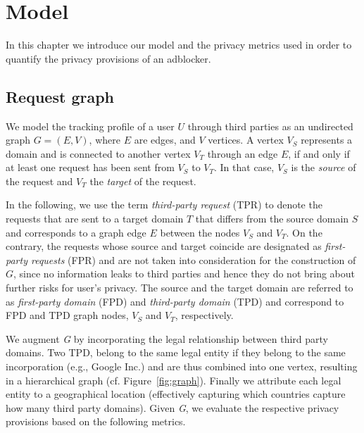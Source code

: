 \chapter{Model}
\label{sec:privacy_metrics}
In this chapter we introduce our model and the privacy metrics used in order to quantify the privacy provisions of an adblocker.

\section{Request graph}
\label{sec:graph_definition}
We model the tracking profile of a user $U$ through third parties as an undirected graph $G=(E,V)$, where $E$ are edges, and $V$ vertices. A vertex $V_S$ represents a domain and is connected to another vertex $V_T$ through an edge $E$, if and only if at least one request has been sent from $V_S$ to $V_T$. In that case, $V_S$ is the \textit{source} of the request and $V_T$ the \textit{target} of the request.

In the following, we use the term \textit{third-party request} (TPR) to denote the requests that are sent to a target domain $T$ that differs from the source domain $S$ and corresponds to a graph edge $E$ between the nodes $V_S$ and $V_T$. On the contrary, the requests whose source and target coincide are designated as \textit{first-party requests} (FPR) and are not taken into consideration for the construction of $G$, since no information leaks to third parties and hence they do not bring about further risks for user's privacy. The source and the target domain are referred to as \textit{first-party domain} (FPD) and \textit{third-party domain} (TPD) and correspond to FPD and TPD graph nodes, $V_S$ and $V_T$, respectively.

We augment \emph{G} by incorporating the legal relationship between third party domains. Two TPD, belong to the same legal entity if they belong to the same incorporation (e.g., Google Inc.) and are thus combined into one vertex, resulting in a hierarchical graph (cf. Figure~\ref{fig:graph}). Finally we attribute each legal entity to a geographical location (effectively capturing which countries capture how many third party domains). Given \emph{G}, we evaluate the respective privacy provisions based on the following metrics.

